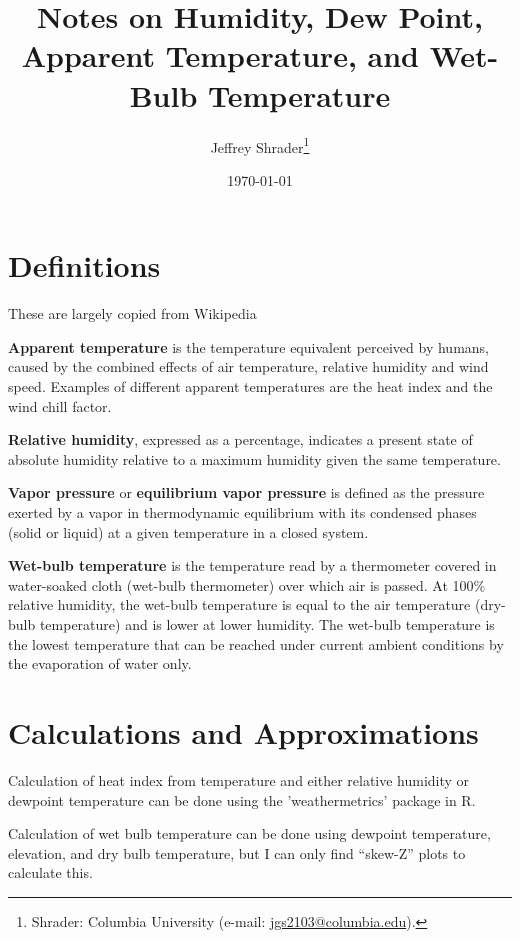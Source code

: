\documentclass[letterpaper,12pt]{article}
\theoremstyle{definition}
\begin{document}
\title{Notes on Humidity, Dew Point, Apparent Temperature, and Wet-Bulb Temperature}
\author{Jeffrey Shrader\thanks{Shrader: Columbia University (e-mail: \url{jgs2103@columbia.edu}).}}


\date{\normalsize \today}

\maketitle

\section{Definitions}
These are largely copied from Wikipedia

\textbf{Apparent temperature} is the temperature equivalent perceived by humans, caused by the combined effects of air temperature, relative humidity and wind speed. Examples of different apparent temperatures are the heat index and the wind chill factor.

\textbf{Relative humidity}, expressed as a percentage, indicates a present state of absolute humidity relative to a maximum humidity given the same temperature.

\textbf{Vapor pressure} or \textbf{equilibrium vapor pressure} is defined as the pressure exerted by a vapor in thermodynamic equilibrium with its condensed phases (solid or liquid) at a given temperature in a closed system.

\textbf{Wet-bulb temperature} is the temperature read by a thermometer covered in water-soaked cloth (wet-bulb thermometer) over which air is passed. At 100\% relative humidity, the wet-bulb temperature is equal to the air temperature (dry-bulb temperature) and is lower at lower humidity. The wet-bulb temperature is the lowest temperature that can be reached under current ambient conditions by the evaporation of water only.


\section{Calculations and Approximations}
Calculation of heat index from temperature and either relative humidity or dewpoint temperature can be done using the 'weathermetrics' package in R.

Calculation of wet bulb temperature can be done using dewpoint temperature, elevation, and dry bulb temperature, but I can only find ``skew-Z'' plots to calculate this. 


\end{document}

